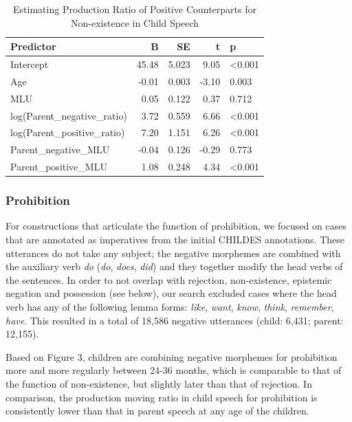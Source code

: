 \documentclass[
  english,
  man,floatsintext]{apa6}
\begin{document}
\begin{table}

\caption{\label{tab:unnamed-chunk-3}Estimating Production Ratio of Positive Counterparts for Non-existence in Child Speech}
\centering
\begin{tabular}[t]{l|r|r|r|l}
\hline
Predictor & B & SE & t & p\\
\hline
Intercept & 45.48 & 5.023 & 9.05 & <0.001\\
\hline
Age & -0.01 & 0.003 & -3.10 & 0.003\\
\hline
MLU & 0.05 & 0.122 & 0.37 & 0.712\\
\hline
log(Parent\_negative\_ratio) & 3.72 & 0.559 & 6.66 & <0.001\\
\hline
log(Parent\_positive\_ratio) & 7.20 & 1.151 & 6.26 & <0.001\\
\hline
Parent\_negative\_MLU & -0.04 & 0.126 & -0.29 & 0.773\\
\hline
Parent\_positive\_MLU & 1.08 & 0.248 & 4.34 & <0.001\\
\hline
\end{tabular}
\end{table}

\clearpage

\hypertarget{prohibition}{%
\subsubsection{Prohibition}\label{prohibition}}

For constructions that articulate the function of prohibition, we focused on cases that are annotated as imperatives from the initial CHILDES annotations. These utterances do not take any subject; the negative morphemes are combined with the auxiliary verb \emph{do} (\emph{do}, \emph{does}, \emph{did}) and they together modify the head verbs of the sentences.
In order to not overlap with rejection, non-existence, epistemic negation and possession (see below), our search excluded cases where the head verb has any of the following lemma forms: \emph{like}, \emph{want}, \emph{know}, \emph{think}, \emph{remember}, \emph{have}. This resulted in a total of 18,586 negative utterances (child: 6,431; parent: 12,155).

Based on Figure 3, children are combining negative morphemes for prohibition more and more regularly between 24-36 months, which is comparable to that of the function of non-existence, but slightly later than that of rejection. In comparison, the production moving ratio in child speech for prohibition is consistently lower than that in parent speech at any age of the children.
\end{document}
